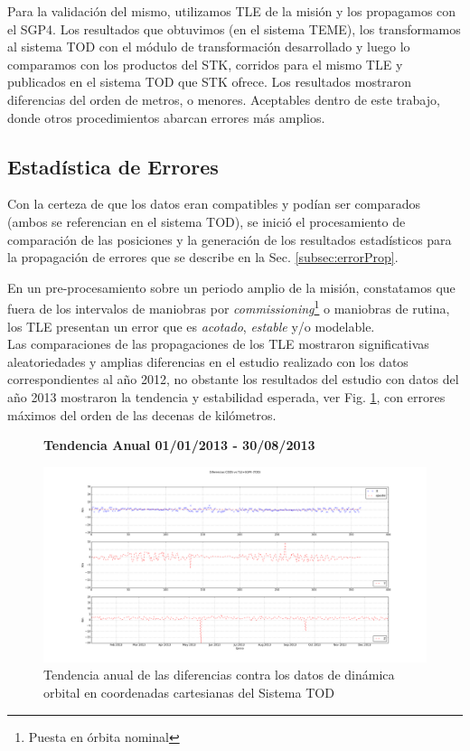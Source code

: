 Para la validaci\'on del mismo, utilizamos TLE de la misi\'on y los propagamos con el SGP4. Los resultados que obtuvimos (en el sistema TEME), los transformamos al sistema TOD con el m\'odulo de transformaci\'on desarrollado y luego lo comparamos con los productos del STK, corridos para el mismo TLE y publicados en el sistema TOD que STK ofrece. Los resultados mostraron diferencias del orden de metros, o menores. Aceptables dentro de este trabajo, donde otros procedimientos abarcan errores m\'as amplios.

\subsection*{Estad\'istica de Errores}
Con la certeza de que los datos eran compatibles y pod\'ian ser comparados (ambos se referencian en el sistema TOD), se inici\'o el procesamiento de comparaci\'on de las posiciones y la generaci\'on de los resultados estad\'isticos para la propagaci\'on de errores que se describe en la Sec. \ref{subsec:errorProp}.

En un pre-procesamiento sobre un periodo amplio de la misi\'on, constatamos que fuera de los intervalos de maniobras por {\it{commissioning}}\footnote{Puesta en \'orbita nominal} o maniobras de rutina, los TLE presentan un error que es {\it{acotado}}, {\it{estable}} y/o modelable. \\

Las comparaciones de las propagaciones de los TLE mostraron significativas aleatoriedades y amplias diferencias en el estudio realizado con los datos correspondientes al a\~no 2012, no obstante los resultados del estudio con datos del a\~no 2013 mostraron la tendencia y estabilidad esperada, ver Fig. \ref{fig:sacd2013}, con errores m\'aximos del orden de las decenas de kil\'ometros.


\begin{figure}[!h]
\centering
  \textbf{Tendencia Anual 01/01/2013 - 30/08/2013}\par\medskip
  \includegraphics[width=\textwidth]{imagenes/SACD2013todEjesajustados}
  \caption{Tendencia anual de las diferencias contra los datos de din\'amica orbital en coordenadas cartesianas del Sistema TOD}
  \label{fig:sacd2013}
\end{figure}

